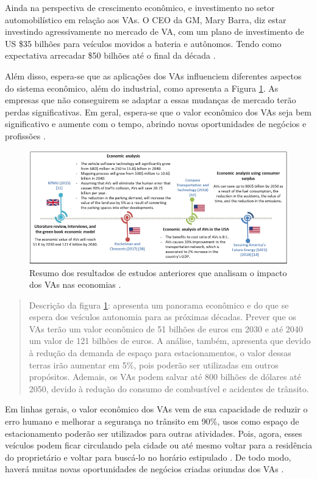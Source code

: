 Ainda na perspectiva de crescimento econômico, e investimento no setor automobilístico em relação aos VAs. O CEO da GM, Mary Barra, diz estar investindo agressivamente no mercado de VA, com um plano de investimento de US \$35 bilhões para veículos movidos a bateria e autônomos. Tendo como expectativa arrecadar \$50 bilhões até o final da década \cite{gm}.

Além disso, espera-se que as aplicações dos VAs influenciem diferentes aspectos do sistema econômico, além do industrial, como apresenta a Figura \ref{figura_resumo}. As empresas que não conseguirem se adaptar a essas mudanças 
 de mercado terão perdas significativas. Em geral, espera-se que o valor econômico dos VAs seja bem significativo e aumente com o tempo, abrindo novas oportunidades de negócios e profissões \cite{mundobrasil}.

\begin{figure}[H]
\centering
\includegraphics[width=\textwidth]{Figures/vas-mercado.png}
\caption{Resumo dos resultados de estudos anteriores que analisam o impacto dos VAs nas economias \cite{mundobrasil}.}
\label{figura_resumo}
\end{figure}

\begin{quote}
Descrição da figura \ref{figura_resumo}: apresenta um panorama econômico e do que se espera dos veículos autonomia para as próximas décadas. Prever que os VAs terão um valor econômico de 51 bilhões de euros em 2030 e até 2040 um valor de 121 bilhões de euros. A análise, também, apresenta que devido à redução da demanda de espaço para estacionamentos, o valor dessas terras irão aumentar em 5\%, pois poderão ser utilizadas em outros propósitos. Ademais, os VAs podem salvar até 800 bilhões de dólares até 2050, devido à redução do consumo de combustível e acidentes de trânsito. 
\end{quote}

Em linhas gerais, o valor econômico dos VAs vem de sua capacidade de reduzir o erro humano e melhorar a segurança no trânsito em 90\%, usos como espaço de estacionamento poderão ser utilizados para outras atividades. Pois, agora, esses veículos podem ficar circulando pela cidade ou até mesmo voltar para a residência do proprietário e voltar para buscá-lo no horário estipulado \cite{4cenarios_ocidental}. De todo modo, haverá muitas novas oportunidades de negócios criadas oriundas dos VAs \cite{mundobrasil}.




